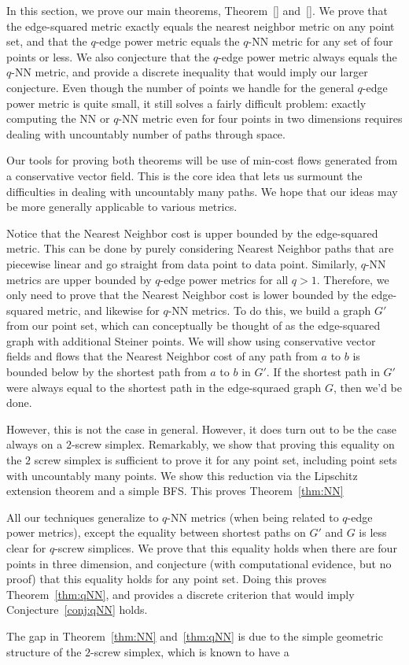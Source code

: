 In this section, we prove our main theorems, Theorem~\ref{} and~\ref{}.
We prove that the edge-squared metric exactly equals the nearest neighbor
metric on any point set, and that the $q$-edge power metric equals the $q$-NN
metric for any set of four points or less. We also conjecture that the $q$-edge
power metric always equals the $q$-NN metric, and provide a discrete
inequality that would imply our larger conjecture. Even though the number of points
we handle for the general $q$-edge power metric is quite small, it still
solves a fairly difficult problem:
exactly computing the NN or $q$-NN metric even for four
points in two dimensions requires dealing with uncountably number of paths
through space.

Our tools for proving both theorems will be use of min-cost flows generated
from a conservative vector field. This is the core idea that lets us surmount
the difficulties in dealing with uncountably many paths. We hope that our ideas
may be more generally applicable to various metrics.  

Notice that the Nearest Neighbor cost is upper bounded by the edge-squared
metric. This can be done by purely considering Nearest Neighbor paths that
are piecewise linear and go straight from data point to data point.
Similarly, $q$-NN metrics are upper bounded by $q$-edge power metrics for
all $q > 1$.
Therefore, we only need to prove that the Nearest Neighbor cost is lower
bounded by the edge-squared metric, and likewise for $q$-NN metrics.
To do this, we build a graph $G'$ from our point set, which can
conceptually be thought of as the edge-squared graph with additional
Steiner points. We will show using conservative vector fields and flows
that the Nearest Neighbor cost of any path from $a$ to $b$ is bounded below
by the shortest path from $a$ to $b$ in $G'$. If the shortest path in $G'$
were always equal to the shortest path in the edge-squraed graph $G$, then
we'd be done.

However, this is not the case in general. However, it does turn out to be
the case always on a $2$-screw simplex. Remarkably, we show that proving
this equality on the $2$ screw simplex is sufficient to prove it for any
point set, including point sets with uncountably many points. We show this
reduction via the Lipschitz extension theorem and a simple
BFS. This proves Theorem~\ref{thm:NN}

All our techniques generalize to $q$-NN metrics (when being related to $q$-edge power
metrics), except the equality
between shortest paths on $G'$ and $G$ is less clear for $q$-screw
simplices. We prove that this equality holds when there are four points in
three dimension, and conjecture (with computational evidence, but no proof) that this
equality holds for any point set. Doing this proves
Theorem~\ref{thm:qNN}, and provides a discrete criterion that would imply
Conjecture~\ref{conj:qNN} holds.

The gap in Theorem~\ref{thm:NN} and~\ref{thm:qNN} is due to the simple
geometric structure of the $2$-screw simplex, which is known to have a
